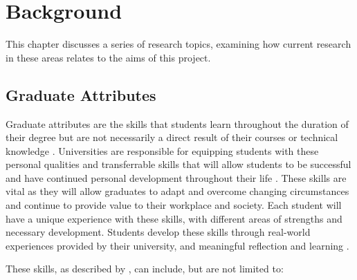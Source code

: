 \documentclass{l4proj}
\begin{document}
\chapter{Background} \label{Background}

This chapter discusses a series of research topics, examining how current research in these areas relates to the aims of this project.

\section{Graduate Attributes} \label{backgroundGraduateAttributes}

Graduate attributes are the skills that students learn throughout the duration of their degree but are not necessarily a direct result of their courses or technical knowledge \citep{glasgow_university_attributes}. Universities are responsible for equipping students with these personal qualities and transferrable skills that will allow students to be successful and have continued personal development throughout their life \citep{stirling_graduate_nodate}. These skills are vital as they will allow graduates to adapt and overcome changing circumstances and continue to provide value to their workplace and society. Each student will have a unique experience with these skills, with different areas of strengths and necessary development. Students develop these skills through real-world experiences provided by their university, and meaningful reflection and learning \citep{edinburgh_definition_skills}.

These skills, as described by \citet{litchfield_contextualising_2010, stevens_industry_2016, bruno_reflective_2018}, can include, but are not limited to:
\end{document}
